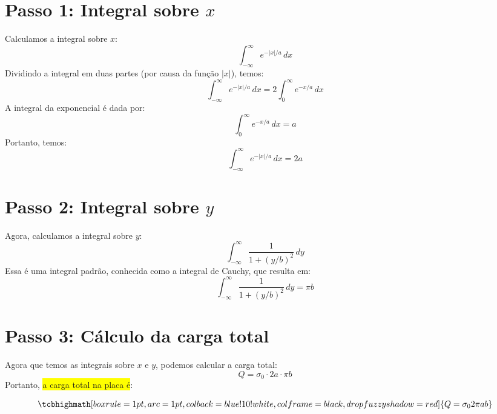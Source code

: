 \documentclass[a4paper,12pt]{article}
\begin{document}
\section*{Passo 1: Integral sobre \(x\)}

Calculamos a integral sobre \(x\):
\begin{equation}
\int_{-\infty}^{\infty} e^{-|x|/a} \, dx
\end{equation}
Dividindo a integral em duas partes (por causa da função \(|x|\)), temos:
\begin{equation}
\int_{-\infty}^{\infty} e^{-|x|/a} \, dx = 2 \int_0^{\infty} e^{-x/a} \, dx
\end{equation}
A integral da exponencial é dada por:
\begin{equation}
\int_0^{\infty} e^{-x/a} \, dx = a
\end{equation}
Portanto, temos:
\begin{equation}
\int_{-\infty}^{\infty} e^{-|x|/a} \, dx = 2a
\end{equation}

\section*{Passo 2: Integral sobre \(y\)}

Agora, calculamos a integral sobre \(y\):
\begin{equation}
\int_{-\infty}^{\infty} \frac{1}{1 + (y/b)^2} \, dy
\end{equation}
Essa é uma integral padrão, conhecida como a integral de Cauchy, que resulta em:
\begin{equation}
\int_{-\infty}^{\infty} \frac{1}{1 + (y/b)^2} \, dy = \pi b
\end{equation}

\section*{Passo 3: Cálculo da carga total}

Agora que temos as integrais sobre \(x\) e \(y\), podemos calcular a carga total:
\begin{equation}
Q = \sigma_0 \cdot 2a \cdot \pi b
\end{equation}
Portanto, \colorbox{yellow}{a carga total na placa é}:

\begin{equation}
\tcbhighmath[boxrule=1pt,arc=1pt,colback=blue!10!white,colframe=black,
drop fuzzy shadow=red]{Q = \sigma_0 2\pi a b }
\end{equation}
\end{document}
